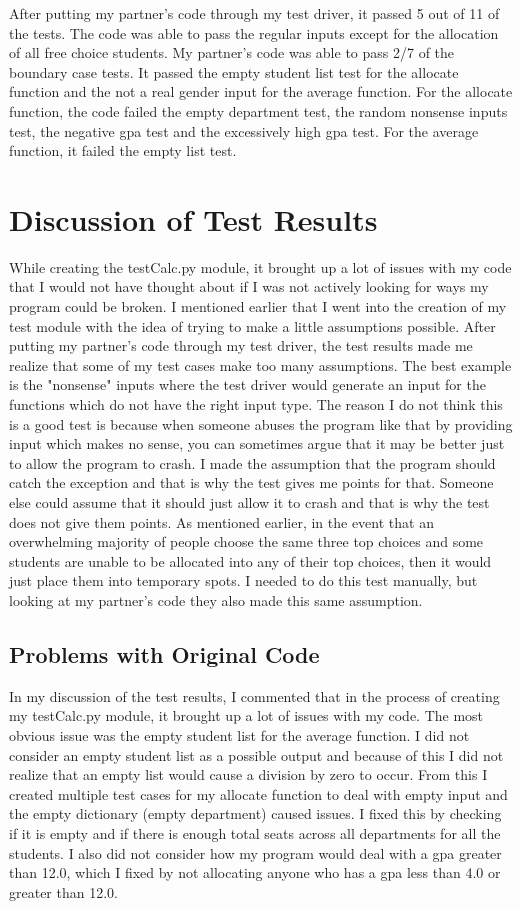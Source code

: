 \documentclass[12pt]{article}
\begin{document}
After putting my partner's code through my test driver, it passed 5 out of 11 of the tests. The code was able to pass the regular inputs except for the allocation of all free choice students. 
My partner's code was able to pass 2/7 of the boundary case tests. It passed the empty student list test for the allocate function and the not a real gender input for the average function.
For the allocate function, the code failed the empty department test, the random nonsense inputs test, the negative gpa test and the excessively high gpa test.
For the average function, it failed the empty list test.

\section{Discussion of Test Results}
While creating the testCalc.py module, it brought up a lot of issues with my code that I would not have thought about if I was not actively looking for ways my program could be broken. I mentioned earlier that I went into the creation of my test module with the idea of trying to make a little assumptions possible. After putting my partner's code through my test driver, the test results made me realize that some of my test cases make too many assumptions. The best example is the "nonsense" inputs where the test driver would generate an input for the functions which do not have the right input type. The reason I do not think this is a good test is because when someone abuses the program like that by providing input which makes no sense, you can sometimes argue that it may be better just to allow the program to crash. I made the assumption that the program should catch the exception and that is why the test gives me points for that. Someone else could assume that it should just allow it to crash and that is why the test does not give them points. As mentioned earlier, in the event that an overwhelming majority of people choose the same three top choices and some students are unable to be allocated into any of their top choices, then it would just place them into temporary spots. I needed to do this test manually, but looking at my partner's code they also made this same assumption.  

\subsection{Problems with Original Code}

In my discussion of the test results, I commented that in the process of creating my testCalc.py module, it brought up a lot of issues with my code. The most obvious issue was the empty student list for the average function. I did not consider an empty student list as a possible output and because of this I did not realize that an empty list would cause a division by zero to occur. From this I created multiple test cases for my allocate function to deal with empty input and the empty dictionary (empty department) caused issues. I fixed this by checking if it is empty and if there is enough total seats across all departments for all the students. I also did not consider how my program would deal with a gpa greater than 12.0, which I fixed by not allocating anyone who has a gpa less than 4.0 or greater than 12.0.
\end{document}
